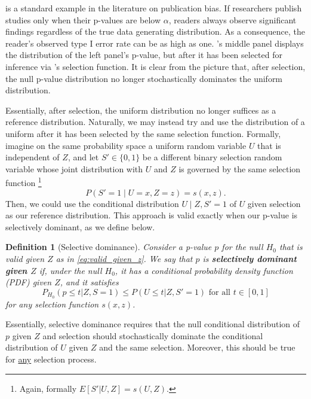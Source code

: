 \documentclass{article}
\newtheorem{definition}{Definition}
\begin{document}
 is a standard example in the literature on publication bias. If researchers publish studies only when their p-values are below $\alpha$, readers always observe significant findings regardless of the true data generating distribution. As a consequence, the reader's observed type I error rate can be as high as one. 's middle panel displays the distribution of the left panel's p-value, but after it has been selected for inference via 's selection function. It is clear from the picture that, after selection, the null p-value distribution no longer stochastically dominates the uniform distribution. 

Essentially, after selection, the uniform distribution no longer suffices as a reference distribution. Naturally, we may instead try and use the distribution of a uniform after it has been selected by the same selection function. Formally, imagine on the same probability space a uniform random variable $U$ that is independent of $Z$, and let $S' \in \{0, 1\}$ be a different binary selection random variable whose joint distribution with $U$ and $Z$ is governed by the same selection function \footnote{Again, formally $E[S'| U, Z]= s(U, Z)$. }
\begin{equation*}
     P(S' = 1 \mid U = x, Z=z ) = s(x, z).
\end{equation*}
Then, we could use the conditional distribution $U \mid Z,  S' = 1$ of $U$ given selection as our reference distribution. This approach is valid exactly when our p-value is selectively dominant, as we define below. 

\begin{definition}[Selective dominance]
    \label{def:selective_dominance}
    Consider a p-value $p$ for the null $H_0$ that is valid given $Z$ as in \eqref{eq:valid_given_z}. We say that $p$ is \textbf{selectively dominant given $Z$} if, under the null $H_0$, it has a conditional probability density function (PDF) given $Z$, and it satisfies 
    \begin{equation}
    \label{eq:selective_dominance}
    P_{H_0}(p \leq t | Z, S=1) \leq P(U \leq t | Z, S'=1) \text{ for all } t \in [0, 1]
    \end{equation}
    for any selection function $s(x, z)$.  
\end{definition}

Essentially, selective dominance requires that the null conditional distribution of $p$ given $Z$ and selection should stochastically dominate the conditional distribution of $U$ given $Z$ and the same selection. Moreover, this should be true for \underline{any} selection process. 
\end{document}
